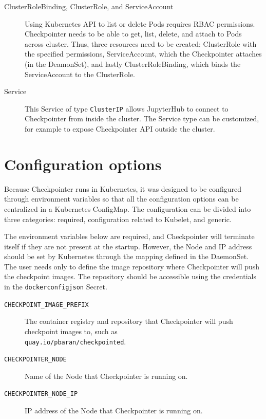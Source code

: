 \documentclass[
  digital,     %
  oneside,     %
  nosansbold,  %
  nocolorbold, %
  lof,         %
  nolot,         %
]{fithesis4}
\begin{document}
\begin{description}
    \item[ClusterRoleBinding, ClusterRole, and ServiceAccount]
    Using Kub\-ernetes API to list or delete Pods requires RBAC permissions. Checkpointer needs to be able to get, list, delete, and attach to Pods across cluster. Thus, three resources need to be created: ClusterRole with the specified permissions, ServiceAccount, which the Checkpointer attaches (in the DeamonSet), and lastly ClusterRoleBinding, which binds the ServiceAccount to the ClusterRole.
    
    \item[Service] This Service of type \texttt{ClusterIP} allows JupyterHub to connect to Checkpointer from inside the cluster. The Service type can be customized, for example to expose Checkpointer API outside the cluster.

\end{description}

\section{Configuration options}
\label{sec:checkpointer:configuration}
Because Checkpointer runs in Kubernetes, it was designed to be configured through environment variables so that all the configuration options can be centralized in a Kubernetes ConfigMap. The configuration can be divided into three categories: required, configuration related to Kubelet, and generic.

The environment variables below are required, and Checkpointer will terminate itself if they are not present at the startup. However, the Node and IP address should be set by Kubernetes through the mapping defined in the DaemonSet. The user needs only to define the image repository where Checkpointer will push the checkpoint images. The repository should be accessible using the credentials in the \texttt{dockerconfigjson} Secret.

\begin{description}
    \item[\texttt{CHECKPOINT\_IMAGE\_PREFIX}] The container registry and repository that Checkpointer will push checkpoint images to, such as \\ \texttt{quay.io/pbaran/checkpointed}.
    \item[\texttt{CHECKPOINTER\_NODE}] Name of the Node that Checkpointer is running on.
    \item[\texttt{CHECKPOINTER\_NODE\_IP}] IP address of the Node that Checkpointer is running on.
\end{description}
\end{document}
